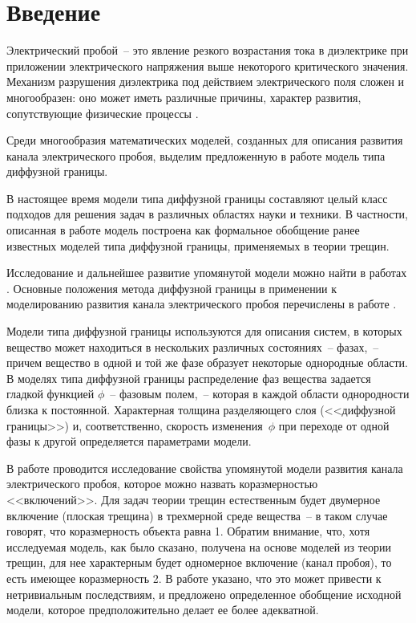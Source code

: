
\section{Введение}

Электрический пробой~-- это явление резкого возрастания тока в диэлектрике при приложении электрического напряжения выше некоторого критического значения. Механизм разрушения диэлектрика под действием электрического поля сложен и многообразен: оно может иметь различные причины, характер развития, сопутствующие физические процессы \cite{vorobiev_dielectric_physics}.

Среди многообразия математических моделей, созданных для описания развития канала электрического пробоя, выделим предложенную в работе \cite{pitike_dielectric_breakdown} модель типа диффузной границы.

В настоящее время модели типа диффузной границы составляют целый класс подходов для решения задач в различных областях науки и техники. В частности, описанная в работе \cite{pitike_dielectric_breakdown} модель построена как формальное обобщение ранее известных моделей типа диффузной границы, применяемых в теории трещин.

Исследование и дальнейшее развитие упомянутой модели можно найти в работах \cite{zipunova_higher_codimension, zipunova_conservative, zipunova_thermomechanical, ponomarev_stability}. Основные положения метода диффузной границы в применении к моделированию развития канала электрического пробоя перечислены в работе \cite{ponomarev_stability}.

Модели типа диффузной границы используются для описания систем, в которых вещество может находиться в нескольких различных состояниях~-- фазах,~-- причем вещество в одной и той же фазе образует некоторые однородные области. В моделях типа диффузной границы распределение фаз вещества задается гладкой функцией $\phi$~-- фазовым полем,~-- которая в каждой области однородности близка к постоянной. Характерная толщина разделяющего слоя (<<диффузной границы>>) и, соответственно, скорость изменения~$\phi$ при переходе от одной фазы к другой определяется параметрами модели.

В работе \cite{zipunova_higher_codimension} проводится исследование свойства упомянутой модели развития канала электрического пробоя, которое можно назвать коразмерностью <<включений>>. Для задач теории трещин естественным будет двумерное включение (плоская трещина) в трехмерной среде вещества~-- в таком случае говорят, что коразмерность объекта равна 1. Обратим внимание, что, хотя исследуемая модель, как было сказано, получена на основе моделей из теории трещин, для нее характерным будет одномерное включение (канал пробоя), то есть имеющее коразмерность 2. В работе \cite{zipunova_higher_codimension} указано, что это может привести к нетривиальным последствиям, и предложено определенное обобщение исходной модели, которое предположительно делает ее более адекватной.

